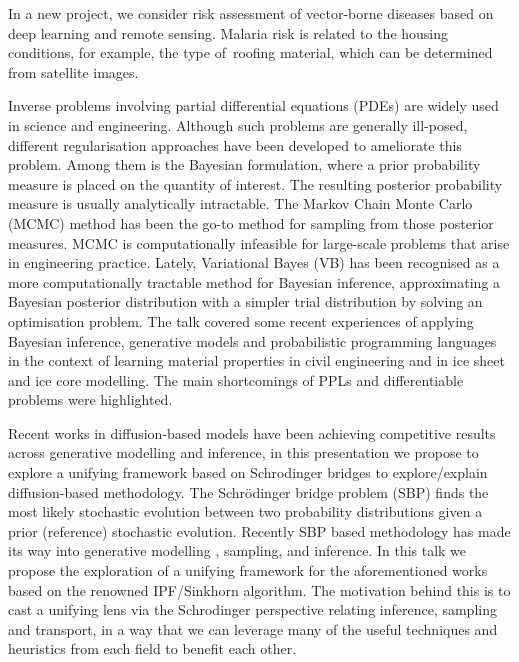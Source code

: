 In a new project, we consider risk assessment of vector-borne diseases based on deep learning and remote sensing. Malaria risk is related to the housing conditions, for example, the type of roofing material, which can be determined from satellite images.

\license

Inverse problems involving partial differential equations (PDEs) are widely used in science and engineering. Although such problems are generally ill-posed, different regularisation approaches have been developed to ameliorate this problem. Among them is the Bayesian formulation, where a prior probability measure is placed on the quantity of interest. The resulting posterior probability measure is usually analytically intractable. The Markov Chain Monte Carlo (MCMC) method has been the go-to method for sampling from those posterior measures. MCMC is computationally infeasible for large-scale problems that arise in engineering practice. Lately, Variational Bayes (VB) has been recognised as a more computationally tractable method for Bayesian inference, approximating a Bayesian posterior distribution with a simpler trial distribution by solving an optimisation problem. The talk covered some recent experiences of applying Bayesian inference, generative models and probabilistic programming languages in the context of learning material properties in civil engineering and in ice sheet and ice core modelling. The main shortcomings of PPLs and differentiable problems were highlighted.

\license

Recent works in diffusion-based models have been achieving competitive results across generative modelling and inference, in this presentation we propose to explore a unifying framework based on Schrodinger bridges to explore/explain diffusion-based methodology. The Schrödinger bridge problem (SBP) finds the most likely stochastic evolution between two probability distributions given a prior (reference) stochastic evolution. Recently SBP based methodology has made its way into generative modelling , sampling, and inference. In this talk we propose the exploration of a unifying framework for the aforementioned works based on the renowned IPF/Sinkhorn algorithm. The motivation behind this is to cast a unifying lens via the Schrodinger perspective relating inference, sampling and transport, in a way that we can leverage many of the useful techniques and heuristics from each field to benefit each other.
